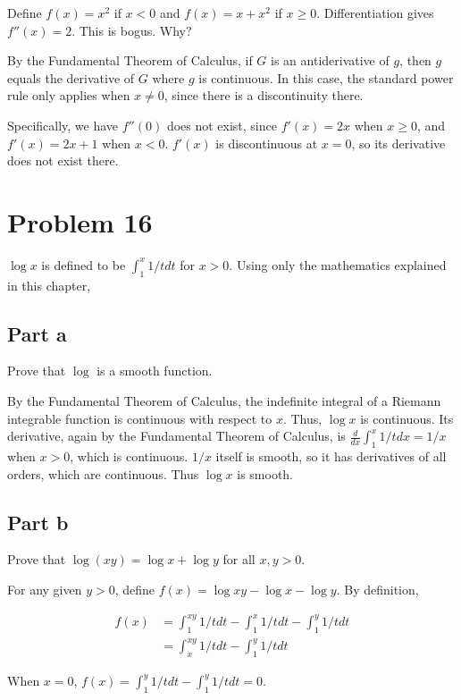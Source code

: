 \documentclass{article}
\begin{document}
Define $f(x) = x^2$ if $x < 0$ and $f(x) = x + x^2$ if $x \geq 0$. Differentiation gives $f''(x) = 2$. This is bogus. Why?

By the Fundamental Theorem of Calculus, if $G$ is an antiderivative of $g$, then $g$ equals the derivative of $G$ where $g$ is continuous. In this case, the standard power rule only applies when $x \neq 0$, since there is a discontinuity there.

Specifically, we have $f''(0)$ does not exist, since $f'(x) = 2x$ when $x \geq 0$, and $f'(x) = 2x + 1$ when $x < 0$. $f'(x)$ is discontinuous at $x=0$, so its derivative does not exist there.

\section*{Problem 16}

$\log x$ is defined to be $\int_1^x 1/t dt$ for $x > 0$. Using only the mathematics explained in this chapter,

\subsection*{Part a}

Prove that $\log$ is a smooth function.

By the Fundamental Theorem of Calculus, the indefinite integral of a Riemann integrable function is continuous with respect to $x$. Thus, $\log x$ is continuous. Its derivative, again by the Fundamental Theorem of Calculus, is $\frac{d}{dx} \int_1^x 1/t dx = 1/x$ when $x > 0$, which is continuous. $1/x$ itself is smooth, so it has derivatives of all orders, which are continuous. Thus $\log x$ is smooth.

\subsection*{Part b}

Prove that $\log(xy) = \log x + \log y$ for all $x, y > 0$.

For any given $y > 0$, define $f(x) = \log xy - \log x - \log y$. By definition,

\begin{align*}
f(x) &= \int_1^{xy} 1/t dt - \int_1^x 1/t dt - \int_1^y 1/t dt \\
&= \int_x^{xy} 1/t dt - \int_1^y 1/t dt
\end{align*}

When $x = 0$, $f(x) = \int_1^{y} 1/t dt - \int_1^{y} 1/t dt = 0$.
\end{document}

